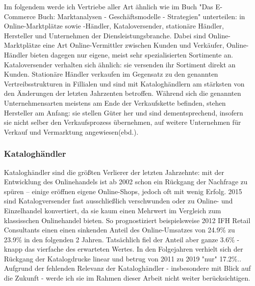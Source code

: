 \begin{folding} %

Im folgendem werde ich Vertriebe aller Art ähnlich wie im Buch "Das E-Commerce Buch: Marktanalysen - Geschäftsmodelle - Strategien" unterteilen: in Online-Marktplätze sowie -Händler, Kataloversender, stationäre Händler, Hersteller und Unternehmen der Diensleistungsbranche\cite[S. 15ff]{Graf}. Dabei sind Online-Marktplätze eine Art Online-Vermittler zwischen Kunden und Verkäufer, Online-Händler bieten dagegen nur eigene, meist sehr spezialisierten Sortimente an. Kataloversender verhalten sich ähnlich: sie versenden ihr Sortiment direkt an Kunden. Stationäre Händler verkaufen im Gegensatz zu den genannten Vertreibsstrukturen in Fillialen und sind mit Kataloghändlern am stärksten von den Änderungen der letzten Jahrzenten betroffen. Während sich die genannten Unternehmensarten meistens am Ende der Verkaufskette befinden, stehen Hersteller am Anfang: sie stellen Güter her und sind dementsprechend, insofern sie nicht selber den Verkaufsprozess übernehmen, auf weitere Unternehmen für Verkauf und Vermarktung angewiesen(ebd.). %

\end{folding}

\begin{folding} \subsubsection{Kataloghändler}

Kataloghändler sind die größten Verlierer der letzten Jahrzehnte: mit der Entwicklung des Onlinehandels ist ab 2002 schon ein Rückgang der Nachfrage zu spüren – einige eröffnen eigene Online-Shops\cite[S. 24f]{Graf}, jedoch oft mit wenig Erfolg\cite[S. 38]{Graf}. 2015 sind Katalogversender fast ausschließlich verschwunden oder zu Online- und Einzelhandel konvertiert, da sie kaum einen Mehrwert im Vergleich zum klassisschen Onlinehandel bieten\cite[S. 47]{Graf}. So prognostiziert beispielsweise 2012 IFH Retail Consultants einen einen sinkenden Anteil des Online-Umsatzes von 24.9\% zu 23.9\% in den folgenden 2 Jahren\cite[S. 20]{evilcom}. Tatsächlich fiel der Anteil aber ganze 3.6\% - knapp das vierfache des erwarteten Wertes. In den Folgejahren verhielt sich der Rückgang der Katalogdrucke linear und betrug von 2011 zu 2019 "nur" 17.2\%.\cite{statista-katalog}. Aufgrund der fehlenden Relevanz der Kataloghändler - insbesondere mit Blick auf die Zukunft - werde ich sie im Rahmen dieser Arbeit nicht weiter berücksichtigen. 

\end{folding}

